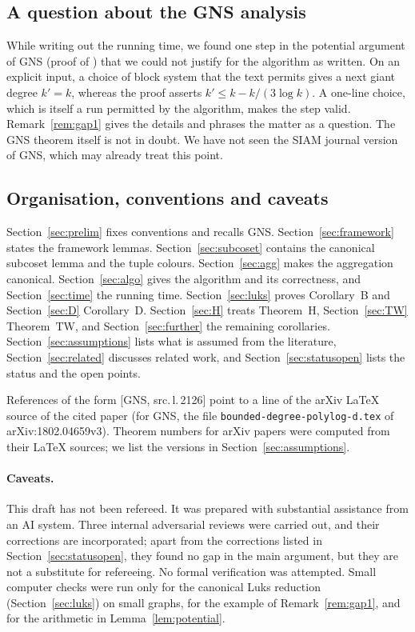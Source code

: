 \documentclass[11pt]{article}
\theoremstyle{plain}
\theoremstyle{definition}
\theoremstyle{remark}
\theoremstyle{named}
\theoremstyle{namedrm}
\newcommand{\src}[2]{[#1, src.\,l.\,#2]}
\begin{document}
\subsection{A question about the GNS analysis}

While writing out the running time, we found one step in the potential argument of GNS
(proof of \cite[Lemma~7.2]{GNS}) that we could not justify for the algorithm as written. On an explicit
input, a choice of block system that the text permits gives a next giant degree $k'=k$, whereas the
proof asserts $k'\le k-k/(3\log k)$. A one-line choice, which is itself a run permitted by the algorithm,
makes the step valid. Remark~\ref{rem:gap1} gives the details and phrases the matter as a question.
The GNS theorem itself is not in doubt. We have not seen the SIAM journal version of GNS, which may
already treat this point.

\subsection{Organisation, conventions and caveats}

Section~\ref{sec:prelim} fixes conventions and recalls GNS. Section~\ref{sec:framework} states the
framework lemmas. Section~\ref{sec:subcoset} contains the canonical subcoset lemma and the tuple
colours. Section~\ref{sec:agg} makes the aggregation canonical. Section~\ref{sec:algo} gives the
algorithm and its correctness, and Section~\ref{sec:time} the running time. Section~\ref{sec:luks}
proves Corollary~B and Section~\ref{sec:D} Corollary~D. Section~\ref{sec:H} treats Theorem~H,
Section~\ref{sec:TW} Theorem~TW, and Section~\ref{sec:further} the remaining corollaries.
Section~\ref{sec:assumptions} lists what is assumed from the literature, Section~\ref{sec:related}
discusses related work, and Section~\ref{sec:statusopen} lists the status and the open points.

References of the form \src{GNS}{2126} point to a line of the arXiv \LaTeX{} source of the cited paper
(for GNS, the file \texttt{bounded-degree-polylog-d.tex} of arXiv:1802.04659v3). Theorem numbers for
arXiv papers were computed from their \LaTeX{} sources; we list the versions in
Section~\ref{sec:assumptions}.

\paragraph{Caveats.} This draft has not been refereed. It was prepared with substantial assistance
from an AI system. Three internal adversarial reviews were carried out, and their corrections are
incorporated; apart from the corrections listed in Section~\ref{sec:statusopen}, they found no gap in
the main argument, but they are not a substitute for refereeing.
No formal verification was attempted. Small computer checks were run only for the canonical Luks
reduction (Section~\ref{sec:luks}) on small graphs, for the example of Remark~\ref{rem:gap1}, and for the
arithmetic in Lemma~\ref{lem:potential}.
\end{document}
